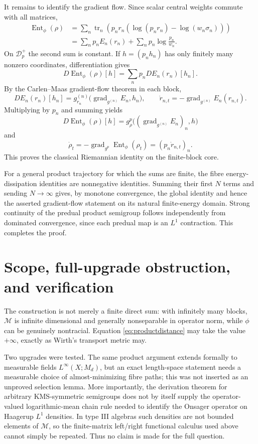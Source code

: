 \documentclass[11pt]{article}
\newcommand{\M}{\mathcal M}
\newcommand{\D}{\mathcal D}
\newcommand{\tr}{\operatorname{tr}}
\newcommand{\Ent}{\operatorname{Ent}}
\begin{document}
It remains to identify the gradient flow.  Since scalar central weights
commute with all matrices,
\begin{align*}
 \Ent_\phi(\rho)
 &=\sum_n\tr_n\!\left(p_nr_n
   \left(\log(p_nr_n)-\log(w_n\sigma_n)\right)\right)\\
 &=\sum_np_nE_n(r_n)+\sum_np_n\log\frac{p_n}{w_n}.
\end{align*}
On $\D_p^+$ the second sum is constant.  If $h=(p_nh_n)$ has only finitely
many nonzero coordinates, differentiation gives
\[
 D\Ent_\phi(\rho)[h]
 =\sum_np_nDE_n(r_n)[h_n].
\]
By the Carlen--Maas gradient-flow theorem in each block,
\[
 DE_n(r_n)[h_n]
 =g^{(n)}_{r_n}\bigl(\operatorname{grad}_{g^{(n)}}E_n,h_n\bigr),
 \qquad
 \dot r_{n,t}=-\operatorname{grad}_{g^{(n)}}E_n(r_{n,t}).
\]
Multiplying by $p_n$ and summing yields
\[
 D\Ent_\phi(\rho)[h]
 =g^p_\rho\bigl((\operatorname{grad}_{g^{(n)}}E_n)_n,h\bigr)
\]
and
\[
 \dot\rho_t
 =-\operatorname{grad}_{g^p}\Ent_\phi(\rho_t)
 =(p_n\dot r_{n,t})_n.
\]
This proves the classical Riemannian identity on the finite-block core.

For a general product trajectory for which the sums are finite, the fibre
energy-dissipation identities are nonnegative identities.  Summing their first
$N$ terms and sending $N\to\infty$ gives, by monotone convergence, the global
identity and hence the asserted gradient-flow statement on its natural
finite-energy domain.  Strong continuity of the predual product semigroup
follows independently from dominated convergence, since each predual map is
an $L^1$ contraction.  This completes the proof.

\section{Scope, full-upgrade obstruction, and verification}

The construction is not merely a finite direct sum: with infinitely many
blocks, $\M$ is infinite dimensional and generally nonseparable in operator
norm, while $\phi$ can be genuinely nontracial.  Equation
\eqref{eq:productdistance} may take the value $+\infty$, exactly as Wirth's
transport metric may.

Two upgrades were tested.  The same product argument extends formally to
measurable fields $L^\infty(X;M_d)$, but an exact length-space statement needs
a measurable choice of almost-minimizing fibre paths; this was not inserted as
an unproved selection lemma.  More importantly, the derivation theorem for
arbitrary KMS-symmetric semigroups \cite{VW} does not by itself supply the
operator-valued logarithmic-mean chain rule needed to identify the Onsager
operator on Haagerup $L^1$ densities.  In type III algebras such densities are
not bounded elements of $\M$, so the finite-matrix left/right functional
calculus used above cannot simply be repeated.  Thus no claim is made for the
full question.
\end{document}

